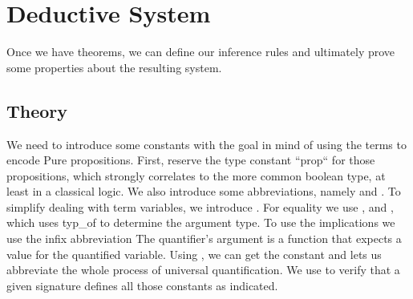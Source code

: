 \chapter{Deductive System}\label{chapter:predicate}

Once we have theorems, we can define our inference rules and ultimately prove some properties about the resulting system.

\section{Theory}

We need to introduce some constants with the goal in mind of using the terms to encode Pure propositions.
First, reserve the type constant ``prop`` for those propositions, which strongly correlates to the more common boolean type, at least in a classical logic.
We also introduce some abbreviations, namely  and .
To simplify dealing with term variables, we introduce .
For equality we  use , and , which uses typ\_of to determine the argument type.
To use the implications we use the infix abbreviation 
The quantifier's argument is a function that expects a value for the quantified variable.
Using , we can get the constant and  lets us abbreviate the whole process of universal quantification.
We use  to verify that a given signature defines all those constants as indicated.


